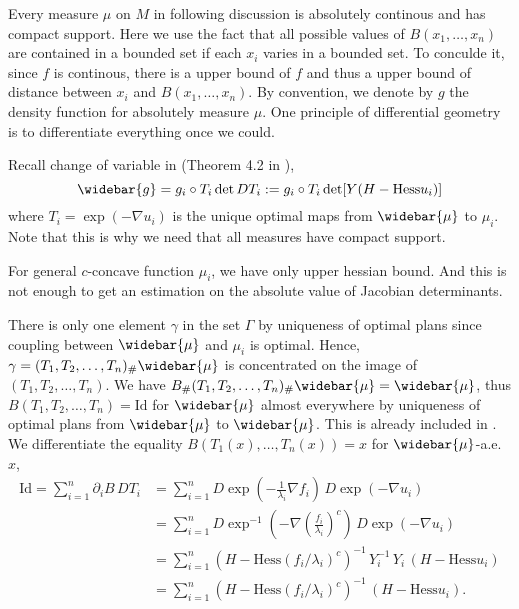 Every measure $\mu$ on $M$ in following discussion is absolutely continous and has compact support.
Here we use the fact that all possible values of $B(x_1, \ldots, x_n)$ are contained in a bounded set if each $x_i$ varies in a bounded set.
To conculde it, since $f$ is continous, there is a upper bound of $f$ and thus a upper bound of distance between $x_i$ and $B(x_1, \ldots, x_n)$.
By convention, we denote by $g$ the density function for absolutely measure $\mu$.
One principle of differential geometry is to differentiate everything once we could.

Recall change of variable in  (Theorem 4.2 in \cite{cordero2001riemannian}),
\[
	\widebar{g} = g_i \circ T_i \det D T_i :
	= g_i \circ T_i \det[Y(H-\text{Hess} u_i)]
\]
where $T_i = \exp(-\nabla u_i)$ is the unique optimal maps from $\widebar{\mu}$ to $\mu_i$.
Note that this is why we need that all measures have compact support.

For general $c$-concave function $\mu_i$, we have only upper hessian bound.
And this is not enough to get an estimation on the absolute value of Jacobian determinants.


There is only one element $\gamma$ in the set $\Gamma$ by uniqueness of optimal plans
since coupling between $\widebar{\mu}$ and $\mu_i$ is optimal.
Hence, $\gamma = (T_1, T_2, \ldots, T_n)_{\#}\widebar{\mu}$
	is concentrated on the image of $(T_1, T_2, \ldots, T_n)$.
We have $B_{\#}(T_1, T_2, \ldots, T_n)_{\#}\widebar{\mu}=\widebar{\mu}$,
thus $B(T_1, T_2, \ldots, T_n) = \text{Id}$ for $\widebar{\mu}$ almost everywhere
by uniqueness of optimal plans from $\widebar{\mu}$ to $\widebar{\mu}$.
This is already included in .
We differentiate the equality $B(T_1(x), \ldots, T_n(x))=x$ for $\widebar{\mu}$-a.e. $x$,
\begin{align*}
	\text{Id} =\sum_{i=1}^n \partial_i B\, DT_i
	 & =\sum_{i=1}^n D \exp(-\frac{1}{\lambda_i}\nabla f_i) \, D \exp(-\nabla u_i)                     \\
	 & =\sum_{i=1}^n D \exp^{-1}(-\nabla \left( \frac{f_i}{\lambda_i}\right)^c) \, D \exp(-\nabla u_i) \\
	 & =\sum_{i=1}^n(H-\text{Hess}(f_i / \lambda_i)^c)^{-1}\,Y_i^{-1}\,
	Y_i\,(H-\text{Hess} u_i)                                                                           \\
	 & =\sum_{i=1}^n(H-\text{Hess}(f_i / \lambda_i)^c)^{-1}\,
	(H-\text{Hess}u_i) .
\end{align*}

